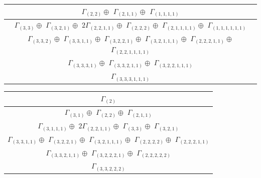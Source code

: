 \documentclass[main.tex]{subfiles}
\begin{document}
\bigskip
\begin{minipage}{1\textwidth}
\centering
\begin{tabular}{c}
$\Gamma_{(
2 , 
2
)} \oplus$
$\Gamma_{(
2 , 
1 , 
1
)} \oplus$
$\Gamma_{(
1 , 
1 , 
1 , 
1
)}$
\\ \hline
$\Gamma_{(
3 , 
3
)} \oplus$
$\Gamma_{(
3 , 
2 , 
1
)} \oplus$
$ 2 \Gamma_{(
2 , 
2 , 
1 , 
1
)} \oplus$
$\Gamma_{(
2 , 
2 , 
2
)} \oplus$
$\Gamma_{(
2 , 
1 , 
1 , 
1 , 
1
)} \oplus$
$\Gamma_{(
1 , 
1 , 
1 , 
1 , 
1 , 
1
)}$
\\ \hline
$\Gamma_{(
3 , 
3 , 
2
)} \oplus$
$\Gamma_{(
3 , 
3 , 
1 , 
1
)} \oplus$
$\Gamma_{(
3 , 
2 , 
2 , 
1
)} \oplus$
$\Gamma_{(
3 , 
2 , 
1 , 
1 , 
1
)} \oplus$
$\Gamma_{(
2 , 
2 , 
2 , 
1 , 
1
)} \oplus$
$\Gamma_{(
2 , 
2 , 
1 , 
1 , 
1 , 
1
)}$
\\ \hline
$\Gamma_{(
3 , 
3 , 
3 , 
1
)} \oplus$
$\Gamma_{(
3 , 
3 , 
2 , 
1 , 
1
)} \oplus$
$\Gamma_{(
3 , 
2 , 
2 , 
1 , 
1 , 
1
)}$
\\ \hline
$\Gamma_{(
3 , 
3 , 
3 , 
1 , 
1 , 
1
)}$
\\
\end{tabular}\end{minipage}
\bigskip
\begin{minipage}{1\textwidth}
\centering
\begin{tabular}{c}
$\Gamma_{(
2
)}$
\\ \hline
$\Gamma_{(
3 , 
1
)} \oplus$
$\Gamma_{(
2 , 
2
)} \oplus$
$\Gamma_{(
2 , 
1 , 
1
)}$
\\ \hline
$\Gamma_{(
3 , 
1 , 
1 , 
1
)} \oplus$
$ 2 \Gamma_{(
2 , 
2 , 
1 , 
1
)} \oplus$
$\Gamma_{(
3 , 
3
)} \oplus$
$\Gamma_{(
3 , 
2 , 
1
)}$
\\ \hline
$\Gamma_{(
3 , 
3 , 
1 , 
1
)} \oplus$
$\Gamma_{(
3 , 
2 , 
2 , 
1
)} \oplus$
$\Gamma_{(
3 , 
2 , 
1 , 
1 , 
1
)} \oplus$
$\Gamma_{(
2 , 
2 , 
2 , 
2
)} \oplus$
$\Gamma_{(
2 , 
2 , 
2 , 
1 , 
1
)}$
\\ \hline
$\Gamma_{(
3 , 
3 , 
2 , 
1 , 
1
)} \oplus$
$\Gamma_{(
3 , 
2 , 
2 , 
2 , 
1
)} \oplus$
$\Gamma_{(
2 , 
2 , 
2 , 
2 , 
2
)}$
\\ \hline
$\Gamma_{(
3 , 
3 , 
2 , 
2 , 
2
)}$
\\
\end{tabular}\end{minipage}
\bigskip
\end{document}
